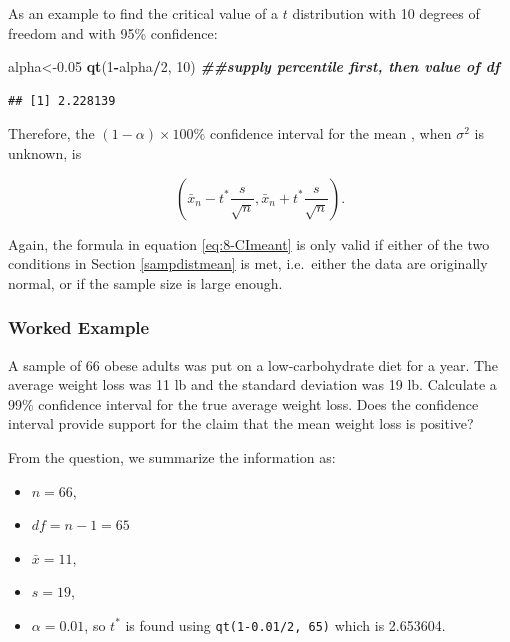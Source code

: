 \documentclass[
]{book}
\newenvironment{Shaded}{\begin{snugshade}}{\end{snugshade}}
\newcommand{\DecValTok}[1]{\textcolor[rgb]{0.00,0.00,0.81}{#1}}
\newcommand{\DocumentationTok}[1]{\textcolor[rgb]{0.56,0.35,0.01}{\textbf{\textit{#1}}}}
\newcommand{\FloatTok}[1]{\textcolor[rgb]{0.00,0.00,0.81}{#1}}
\newcommand{\FunctionTok}[1]{\textcolor[rgb]{0.13,0.29,0.53}{\textbf{#1}}}
\newcommand{\NormalTok}[1]{#1}
\newcommand{\OtherTok}[1]{\textcolor[rgb]{0.56,0.35,0.01}{#1}}
\newcommand{\SpecialCharTok}[1]{\textcolor[rgb]{0.81,0.36,0.00}{\textbf{#1}}}
\providecommand{\tightlist}{%
  \setlength{\itemsep}{0pt}\setlength{\parskip}{0pt}}
\begin{document}
As an example to find the critical value of a \(t\) distribution with 10 degrees of freedom and with 95\% confidence:

\begin{Shaded}
\begin{Highlighting}[]
\NormalTok{alpha}\OtherTok{\textless{}{-}}\FloatTok{0.05}
\FunctionTok{qt}\NormalTok{(}\DecValTok{1}\SpecialCharTok{{-}}\NormalTok{alpha}\SpecialCharTok{/}\DecValTok{2}\NormalTok{, }\DecValTok{10}\NormalTok{) }\DocumentationTok{\#\#supply percentile first, then value of df}
\end{Highlighting}
\end{Shaded}

\begin{verbatim}
## [1] 2.228139
\end{verbatim}

Therefore, the \((1-\alpha) \times 100\%\) confidence interval for the mean , when \(\sigma^2\) is unknown, is

\begin{equation} 
\left( \bar{x}_n - t^{*} \frac{s}{\sqrt{n}}, \bar{x}_n + t^{*} \frac{s}{\sqrt{n}} \right).
\label{eq:8-CImeant}
\end{equation}

Again, the formula in equation \eqref{eq:8-CImeant} is only valid if either of the two conditions in Section \ref{sampdistmean} is met, i.e.~either the data are originally normal, or if the sample size is large enough.

\hypertarget{worked-example-2}{%
\subsubsection{Worked Example}\label{worked-example-2}}

A sample of 66 obese adults was put on a low-carbohydrate diet for a year. The average weight loss was 11 lb and the
standard deviation was 19 lb. Calculate a 99\% confidence interval for the true average weight loss. Does the confidence interval provide support for the claim that the mean weight loss is positive?

From the question, we summarize the information as:

\begin{itemize}
\tightlist
\item
  \(n = 66\),
\item
  \(df = n-1 = 65\)
\item
  \(\bar{x} = 11\),
\item
  \(s = 19\),
\item
  \(\alpha = 0.01\), so \(t^*\) is found using \texttt{qt(1-0.01/2,\ 65)} which is 2.653604.
\end{itemize}
\end{document}
